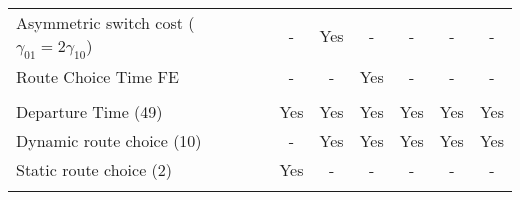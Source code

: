 {\begin{tabular}{lcccccc}
 \addlinespace 
  Asymmetric switch cost ($\gamma_{01}=2\gamma_{10}$)  & - & Yes &  -  &  -  &  -  &  -  \\ 
 \addlinespace 
  Route Choice Time FE                 & - & -   & Yes &  -  &  -  &  -  \\ 
 \addlinespace 
 \addlinespace 
\multicolumn{7}{l}{\textit{Moments:}}  \\ 
 \addlinespace 
  Departure Time (49)           & Yes & Yes & Yes & Yes & Yes & Yes  \\ 
 \addlinespace 
  Dynamic route choice (10)     & -   & Yes & Yes & Yes & Yes & Yes\\ 
 \addlinespace 
  Static route choice (2)       & Yes & -   & -   & -   & -   & -  \\ 
 \addlinespace 
    \bottomrule 
 \end{tabular} 
 } 

